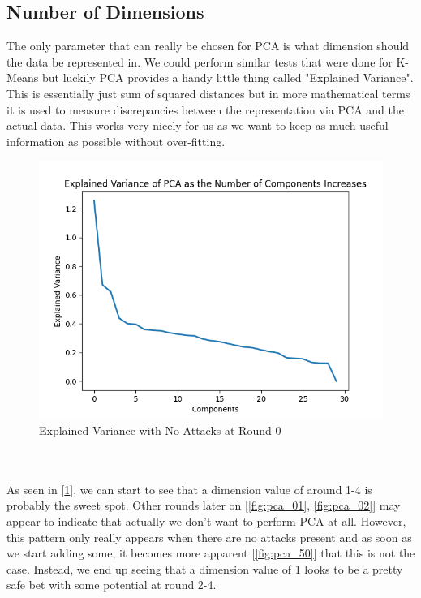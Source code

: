 \subsection{Number of Dimensions}
The only parameter that can really be chosen for PCA is what dimension should the data be represented in.
We could perform similar tests that were done for K-Means but luckily PCA provides a handy little thing called "Explained Variance".
This is essentially just sum of squared distances but in more mathematical terms it is used to measure discrepancies between the representation via PCA and the actual data.
This works very nicely for us as we want to keep as much useful information as possible without over-fitting.
\begin{figure}[htbp]
	\centering
    \includegraphics[scale=0.5]{my_agg/graphs/0_r0.png}
	\caption{Explained Variance with No Attacks at Round 0}
	\label{fig:pca_00}
\end{figure}
\\ \\
As seen in [\ref{fig:pca_00}], we can start to see that a dimension value of around 1-4 is probably the sweet spot.
Other rounds later on [\ref{fig:pca_01}, \ref{fig:pca_02}] may appear to indicate that actually we don't want to perform PCA at all.
However, this pattern only really appears when there are no attacks present and as soon as we start adding some, it becomes more apparent [\ref{fig:pca_50}] that this is not the case.
Instead, we end up seeing that a dimension value of 1 looks to be a pretty safe bet with some potential at round 2-4.


